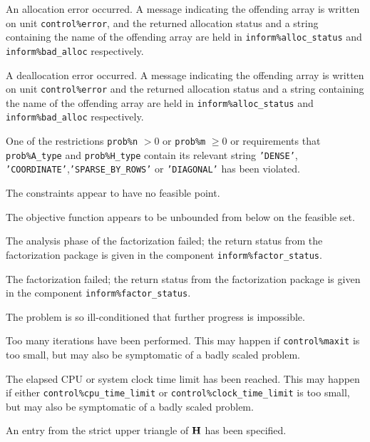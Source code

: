 \documentclass{galahad}
\begin{document}
\begin{description}

 An allocation error occurred. 
A message indicating the offending 
array is written on unit {\tt control\%error}, and the returned allocation 
status and a string containing the name of the offending array
are held in {\tt inform\%alloc\_\-status}
and {\tt inform\%bad\_alloc} respectively.

 A deallocation error occurred. 
A message indicating the offending 
array is written on unit {\tt control\%error} and the returned allocation 
status and a string containing the name of the offending array
are held in {\tt inform\%alloc\_\-status}
and {\tt inform\%bad\_alloc} respectively.

 One of the restrictions 
    {\tt prob\%n} $> 0$ or {\tt prob\%m} $\geq  0$
    or requirements that {\tt prob\%A\_type} 
    and {\tt prob\%H\_type} contain its relevant string
    {\tt 'DENSE'}, {\tt 'COORDINATE'},{\tt 'SPARSE\_BY\_ROWS'} 
    or {\tt 'DIAGONAL'}
    has been violated.


 The constraints appear to have no feasible point.

   The objective function appears to be unbounded from below on the
    feasible set.

 The analysis phase of the factorization failed; 
 the return status from the factorization
    package is given in the component {\tt inform\%fac\-t\-or\_status}.

   The factorization failed; the return status from the factorization
    package is given in the component {\tt inform\%fac\-t\-or\_status}.

 The problem is so ill-conditioned that 
  further progress is impossible.

    Too many iterations have been performed. This may happen if
    {\tt control\%maxit} is too small, but may also be symptomatic of 
    a badly scaled problem.

 The elapsed CPU or system clock time limit has been 
    reached. This may happen if either {\tt control\%cpu\_time\_limit} or
    {\tt control\%clock\_time\_limit} is too small, but may also be symptomatic 
    of a badly scaled problem.

 An entry from the strict upper triangle of ${\mathbf{H}}$ 
 has been specified.

\end{description}
\end{document}
